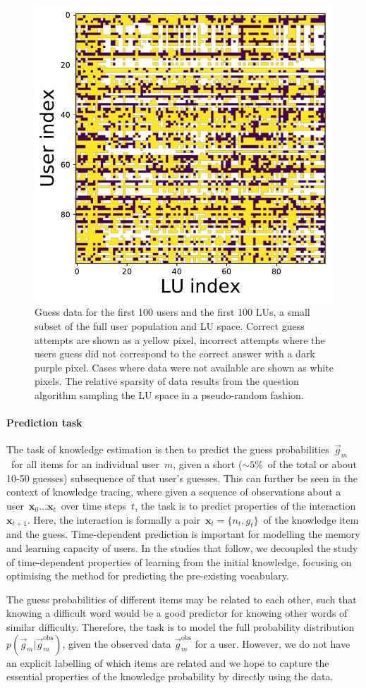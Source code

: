 \begin{figure}[ht]
\centering
\includegraphics[width=0.5\linewidth]{figures/lingvist/user_data.pdf}
\caption[Word pair (LU) guess data for a subset of users and words]{Guess data for the first 100 users and the first 100 LUs, a small subset of the full user population and LU space. Correct guess attempts are shown as a yellow pixel, incorrect attempts where the users guess did not correspond to the correct answer with a dark purple pixel. Cases where data were not available are shown as white pixels. The relative sparsity of data results from the question algorithm sampling the LU space in a pseudo-random fashion.} 
\label{fig:user_data} 
\end{figure} 

\paragraph{Prediction task}
The task of knowledge estimation is then to predict the guess probabilities~$\vec{g}_m$~for all items for an individual user~$m$, given a short ($\sim5\%$~of the total or about 10-50 guesses) subsequence of that user's guesses. This can further be seen in the context of knowledge tracing, where given a sequence of observations about a user~$\mathbf{x}_0 \dots \mathbf{x}_t$~over time steps~$t$, the task is to predict properties of the interaction~$\mathbf{x}_{t+1}$. Here, the interaction is formally a pair~$\mathbf{x}_t = \{n_t, g_t\}$~of the knowledge item and the guess. Time-dependent prediction is important for modelling the memory and learning capacity of users. In the studies that follow, we decoupled the study of time-dependent properties of learning from the initial knowledge, focusing on optimising the method for predicting the pre-existing vocabulary.

The guess probabilities of different items may be related to each other, such that knowing a difficult word would be a good predictor for knowing other words of similar difficulty. Therefore, the task is to model the full probability distribution~$p(\vec{g}_m | \vec{g}_m^{\mathrm{obs}})$, given the observed data $\vec{g}_m^{\mathrm{obs}}$ for a user. However, we do not have an explicit labelling of which items are related and we hope to capture the essential properties of the knowledge probability by directly using the data.

